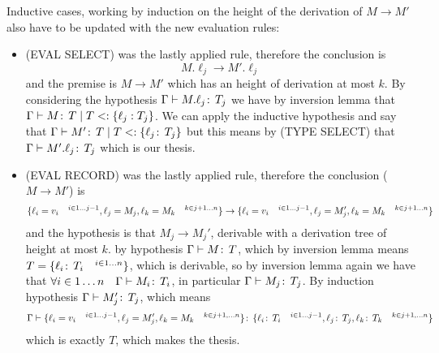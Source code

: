 Inductive cases, working by induction on the height of the derivation
of $M \to M'$ also have to be updated with the new evaluation rules:
\begin{itemize}
\item (EVAL SELECT) was the lastly applied rule, therefore the
  conclusion is \[M.\ell_j \to M'.\ell_j\] and the premise is \(M\to
  M'\) which has an height of derivation at most \(k\). By considering
  the hypothesis \(\Gamma\vdash M.\ell_j \!:\,T_j\) we have by
  inversion lemma that \(\Gamma\vdash M \!:\,T \mid T <: \{\ell_j
    : T_j\}\). We can apply the inductive hypothesis and say that
  \(\Gamma\vdash M' \!:\,T \mid T <: \{\ell_j \!:\,T_j\}\) but
  this means by (TYPE SELECT) that \(\Gamma \vdash M'.\ell_j
  \!:\,T_j\) which is our thesis.
\item (EVAL RECORD) was the lastly applied rule, therefore the
  conclusion (\(M \to M'\)) is \[\{\ell_i = v_i \quad^{i\in 1\dots
      j-1}, \ell_j = M_j, \ell_k = M_k \quad^{k\in j+1\dots n}\} \to
  \{ \ell_i = v_i \quad^{i\in 1\dots j-1}, \ell_j = M_j', \ell_k =
    M_k \quad^{k\in j+1\dots n}\}\] and the hypothesis is that \(M_j\to
  M_j'\), derivable with a derivation tree of height at most \(k\). by
  hypothesis \(\Gamma \vdash M \!:\,T\), which by inversion lemma
  means \(T = \{\ell_i \!:\,T_i \quad^{i \in 1 \dots n}\}\), which
  is derivable, so by inversion lemma again we have that \(\forall i
  \in 1 \dots n \quad \Gamma\vdash M_i \!:\,T_i\), in particular
  \(\Gamma \vdash M_j \!:\,T_j\). By induction hypothesis \(\Gamma
  \vdash M_j' \!:\,T_j\), which means \[\Gamma \vdash \{\ell_i =
    v_i \quad^{i\in 1 \dots j-1}, \ell_j = M_j', \ell_k = M_k
    \quad^{k\in j+1, \dots n}\} \!:\,\{\ell_i \!:\,T_i
      \quad^{i\in 1 \dots j-1}, \ell_j \!:\,T_j, \ell_k \!:\,T_k
      \quad^{k\in j+1, \dots n}\}\] which is exactly \(T\), which
  makes the thesis.
\end{itemize}
